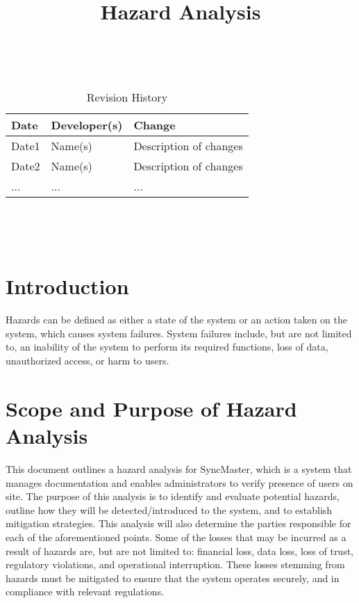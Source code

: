 \documentclass{article}
\title{Hazard Analysis\\\progname}
\author{\authname}
\date{}
\begin{document}
\maketitle
\thispagestyle{empty}

~\newpage


\begin{table}[hp]
  \caption{Revision History} \label{TblRevisionHistory}
  \begin{tabularx}{\textwidth}{llX}
    \toprule
    \textbf{Date} & \textbf{Developer(s)} & \textbf{Change}\\
    \midrule
    Date1 & Name(s) & Description of changes\\
    Date2 & Name(s) & Description of changes\\
    ... & ... & ...\\
    \bottomrule
  \end{tabularx}
\end{table}

~\newpage

\tableofcontents

~\newpage


\section{Introduction}

Hazards can be defined as either a state of the system or an action
taken on the system, which causes system failures. System failures
include, but are not limited to, an inability of the system to
perform its required functions, loss of data, unauthorized access,
or harm to users.

\section{Scope and Purpose of Hazard Analysis}

This document outlines a hazard analysis for SyncMaster, which is a system that
manages documentation and enables administrators to verify presence of users on
site. The purpose of this analysis is to identify and evaluate potential
hazards, outline how they will be detected/introduced to the system, and to
establish mitigation strategies. This analysis will also determine
the parties responsible
for each of the aforementioned points. Some of the losses that
may be incurred as a result of hazards are, but are not limited to:
financial loss, data loss, loss of trust, regulatory violations, and
operational interruption. These losses stemming from hazards must be mitigated
to ensure that the system operates securely, and in compliance with relevant
regulations.
\end{document}
